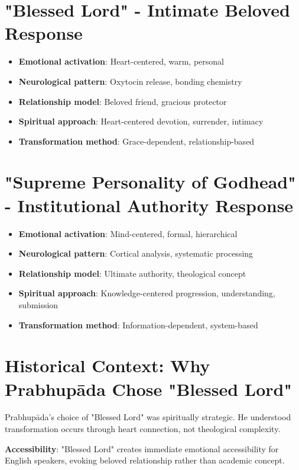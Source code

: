 \documentclass[11pt,twoside]{book}
\begin{document}
\section*{"Blessed Lord" - Intimate Beloved Response}
\label{sec:org50acddc}
\begin{itemize}
\item \textbf{\textbf{Emotional activation}}: Heart-centered, warm, personal
\item \textbf{\textbf{Neurological pattern}}: Oxytocin release, bonding chemistry
\item \textbf{\textbf{Relationship model}}: Beloved friend, gracious protector
\item \textbf{\textbf{Spiritual approach}}: Heart-centered devotion, surrender, intimacy
\item \textbf{\textbf{Transformation method}}: Grace-dependent, relationship-based
\end{itemize}
\section*{"Supreme Personality of Godhead" - Institutional Authority Response}
\label{sec:orgae322db}
\begin{itemize}
\item \textbf{\textbf{Emotional activation}}: Mind-centered, formal, hierarchical
\item \textbf{\textbf{Neurological pattern}}: Cortical analysis, systematic processing
\item \textbf{\textbf{Relationship model}}: Ultimate authority, theological concept
\item \textbf{\textbf{Spiritual approach}}: Knowledge-centered progression, understanding, submission
\item \textbf{\textbf{Transformation method}}: Information-dependent, system-based
\end{itemize}
\section*{Historical Context: Why Prabhupāda Chose "Blessed Lord"}
\label{sec:org1adf220}

Prabhupāda's choice of "Blessed Lord" was spiritually strategic. He understood transformation occurs through heart connection, not theological complexity.

\textbf{\textbf{Accessibility}}: "Blessed Lord" creates immediate emotional accessibility for English speakers, evoking beloved relationship rather than academic concept.
\end{document}
